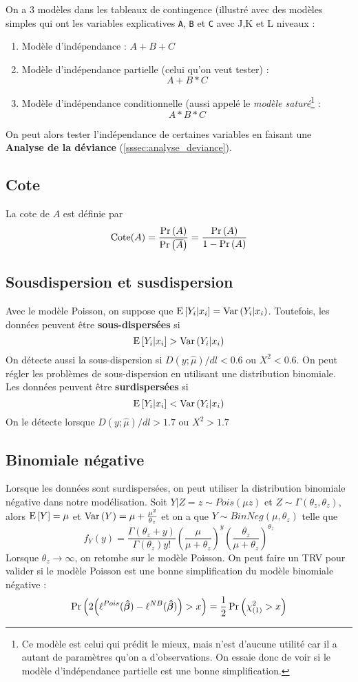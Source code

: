 \documentclass[10pt, french]{article}
\begin{document}
\begin{multicols*}{3}
On a 3 modèles dans les tableaux de contingence (illustré avec des modèles simples qui ont les variables explicatives \verb=A=, \verb=B= et \verb=C= avec J,K et L niveaux  : 
\begin{enumerate}[label=\faAngleRight]
\item Modèle d'indépendance : $A + B + C$

\item Modèle d'indépendance partielle (celui qu'on veut tester) : 
\[A + B * C\]

\item Modèle d'indépendance conditionnelle (aussi appelé le \emph{modèle saturé}\footnote{Ce modèle est celui qui prédit le mieux, mais n'est d'aucune utilité car il a autant de paramètres qu'on a d'observations. On essaie donc de voir si le modèle d'indépendance partielle est une bonne simplification.} : 
\[A * B * C\]
\end{enumerate}
On peut alors tester l'indépendance de certaines variables en faisant une \textbf{Analyse de la déviance} (\autoref{sssec:analyse_deviance}).


\subsection*{Cote}
La cote de $A$ est définie par
\[\mathrm{Cote}(A) = \frac{\Pr \left( A \right)}{\Pr \left( \overline{A} \right)} = \frac{\Pr \left( A \right)}{1 - \Pr \left( A \right)} \]


\subsection*{Sousdispersion et susdispersion}
Avec le modèle Poisson, on suppose que $\mathrm{E} \left[ Y_i |x_i \right] = \mathrm{Var} \left( Y_i | x_i \right)$. Toutefois, les données peuvent être \textbf{sous-dispersées} si
\[  \mathrm{E} \left[ Y_i |x_i \right] > \mathrm{Var} \left( Y_i | x_i \right) \]
On détecte aussi la sous-dispersion si $D(y ; \hat{\mu}) / dl < 0.6$ ou $X^2 < 0.6$. On peut régler les problèmes de sous-dispersion en utilisant une distribution binomiale. Les données peuvent être \textbf{surdispersées} si
\[ \mathrm{E} \left[ Y_i |x_i \right] < \mathrm{Var} \left( Y_i | x_i \right)  \]
On le détecte lorsque $D(y ; \hat{\mu}) / dl > 1.7$ ou $X^2 > 1.7$

\subsection*{Binomiale négative}
Lorsque les données sont surdispersées, on peut utiliser la distribution binomiale négative dans notre modélisation. Soit $Y | Z = z \sim Pois(\mu z)$ et $Z \sim \Gamma(\theta_z, \theta_z)$, alors $\mathrm{E} \left[ Y \right] = \mu$ et $\mathrm{Var} \left( Y \right) = \mu + \frac{\mu^2}{\theta_z}$ et on a que $Y \sim BinNeg(\mu, \theta_z)$ telle que
\[f_Y(y) = \frac{\Gamma(\theta_z + y)}{\Gamma(\theta_z) y!} \left( \frac{\mu}{\mu + \theta_z} \right)^{y} \left( \frac{\theta_z}{\mu + \theta_z} \right)^{\theta_z}  \]
Lorsque $\theta_z \to \infty$, on retombe sur le modèle Poisson. On peut faire un TRV pour valider si le modèle Poisson est une bonne simplification du modèle binomiale négative : 
\[ \Pr \left(  2\Big(\ell^{Pois}(\bm{\hat{\beta}}) - \ell^{NB}(\bm{\hat{\beta}}) \Big) > x \right) = \frac{1}{2} \Pr \left( \chi_{(1)}^2 > x \right) \] 


\end{multicols*}
\end{document}
